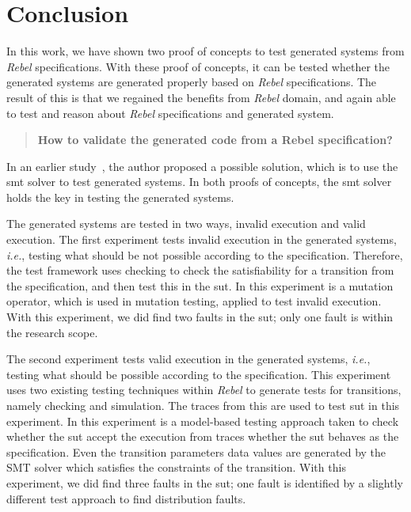 \chapter{Conclusion}\label{sec:ch7}

In this work, we have shown two proof of concepts to test generated systems from
\textit{Rebel} specifications. With these proof of concepts, it can be tested
whether the generated systems are generated properly based on \textit{Rebel}
specifications. The result of this is that we regained the benefits from
\textit{Rebel} domain, and again able to test and reason about \textit{Rebel}
specifications and generated system.

\begin{quote}
  \textbf{How to validate the generated code from a Rebel specification?}
\end{quote}

In an earlier study~\cite[p.3]{stoel2015case}, the author proposed a possible
solution, which is to use the \gls{smt} solver to test generated systems.
In both proofs of concepts, the \gls{smt} solver holds the key in testing the
generated systems.

The generated systems are tested in two ways, invalid execution and valid execution.
The first experiment tests invalid execution in the generated systems, \textit{i.e.},
testing what should be not possible according to the specification.
Therefore, the test framework uses checking to check the satisfiability for a
transition from the specification, and then test this in the \gls{sut}.
In this experiment is a mutation operator, which is used in mutation testing,
applied to test invalid execution. With this experiment, we did find two faults in
the \gls{sut}; only one fault is within the research scope.

The second experiment tests valid execution in the generated systems,
\textit{i.e.}, testing what should be possible according to the specification.
This experiment uses two existing testing techniques within \textit{Rebel} to
generate tests for transitions, namely checking and simulation.
The traces from this are used to test \gls{sut} in this experiment.
In this experiment is a model-based testing approach taken to check whether the
\gls{sut} accept the execution from traces whether the \gls{sut} behaves as the
specification.
Even the transition parameters data values are generated by the SMT solver which
satisfies the constraints of the transition. With this experiment, we did find
three faults in the \gls{sut}; one fault is identified by a slightly different test
approach to find distribution faults.

